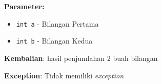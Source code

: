 \documentclass{article}
\begin{document}
\begin{enumerate}
\begin{itemize}
\textbf{Parameter:}
\begin{itemize}
\item \texttt{int a} - 
Bilangan Pertama
\item \texttt{int b} - 
Bilangan Kedua
\end{itemize}
\textbf{Kembalian}: hasil penjumlahan 2 buah bilangan

\textbf{Exception}: Tidak memiliki \textit{exception}

\end{itemize}
\end{enumerate}
\end{document}
